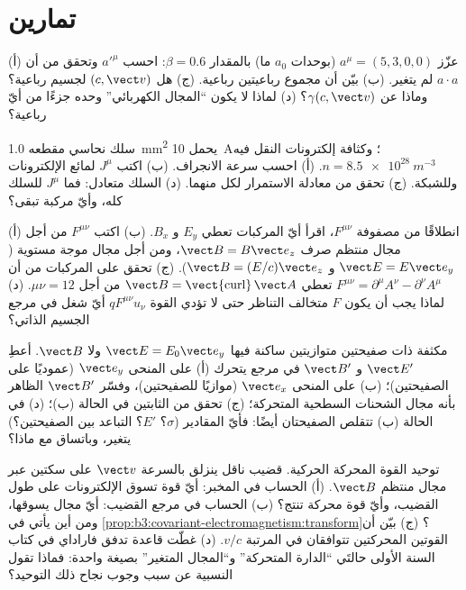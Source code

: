 \section{تمارين}

\begin{exercise}[$\star$]\label{exo:b3:covariant-electromagnetism:1}
(أ) عزّز $a^\mu = (5, 3, 0, 0)$ (بوحدات $a_0$ ما) بالمقدار $\beta =
0.6$: احسب $a'^\mu$ وتحقق من أن $a\cdot a$ لم يتغير. (ب) بيّن
أن مجموع رباعيتين رباعية. (ج) هل $(c,
\vect v)$ لجسيم رباعية؟ وماذا عن $\gamma(c, \vect v)$؟ (د)
لماذا لا يكون ``المجال الكهربائي'' وحده جزءًا من أيّ رباعية؟
\end{exercise}

\begin{exercise}[$\star$]\label{exo:b3:covariant-electromagnetism:2}
سلك نحاسي مقطعه \qty{1.0}{mm^2} يحمل \qty{10}{A}؛
وكثافة إلكترونات النقل فيه $n = \qty{8.5e28}{m^{-3}}$. (أ) احسب
سرعة الانجراف. (ب) اكتب $J^\mu$ لمائع الإلكترونات وللشبكة.
(ج) تحقق من معادلة الاستمرار لكل منهما. (د) السلك
متعادل: فما $J^\mu$ للسلك كله، وأيّ مركبة تبقى؟
\end{exercise}

\begin{exercise}[$\star$]\label{exo:b3:covariant-electromagnetism:3}
(أ) انطلاقًا من مصفوفة $F^{\mu\nu}$، اقرأ أيّ المركبات تعطي
$E_y$ و $B_x$. (ب) اكتب $F^{\mu\nu}$ من أجل مجال منتظم صرف
$\vect B = B\vect e_z$، ومن أجل مجال موجة مستوية
($\vect E = E\vect e_y$ و $\vect B = (E/c)\vect e_z$). (ج) تحقق على
المركبات من أن $F^{\mu\nu} = \partial^\mu A^\nu - \partial^\nu
A^\mu$ تعطي $\vect B = \operatorname{\vect{curl}}\vect A$ من أجل
$\mu\nu = 12$. (د) لماذا يجب أن يكون $F$ متخالف التناظر حتى لا تؤدي القوة
$qF^{\mu\nu}u_\nu$ أيّ شغل في مرجع الجسيم الذاتي؟
\end{exercise}

\begin{exercise}[$\star$]\label{exo:b3:covariant-electromagnetism:4}
مكثفة ذات صفيحتين متوازيتين ساكنة فيها $\vect E = E_0\vect e_y$
ولا $\vect B$. أعطِ $\vect E'$ و $\vect B'$ في مرجع يتحرك (أ)
على المنحى $\vect e_y$ (عموديًا على الصفيحتين)؛ (ب) على المنحى $\vect
e_x$ (موازيًا للصفيحتين)، وفسّر $\vect B'$ الظاهر
بأنه مجال الشحنات السطحية المتحركة؛ (ج) تحقق من الثابتين
في الحالة (ب)؛ (د) في الحالة (ب) تتقلص الصفيحتان أيضًا: فأيّ
المقادير ($\sigma$؟ $E'$؟ التباعد بين الصفيحتين؟) يتغير، وباتساق مع ماذا؟
\end{exercise}

\begin{exercise}[$\star\star$]\label{exo:b3:covariant-electromagnetism:5}
توحيد القوة المحركة الحركية. قضيب ناقل ينزلق بالسرعة $\vect v$ على سكتين
عبر مجال منتظم $\vect B$. (أ) الحساب في المخبر: أيّ قوة تسوق
الإلكترونات على طول القضيب، وأيّ قوة محركة تنتج؟ (ب) الحساب في مرجع القضيب:
أيّ مجال يسوقها، ومن أين يأتي في
\cref{prop:b3:covariant-electromagnetism:transform}؟ (ج) بيّن أن
القوتين المحركتين تتوافقان في المرتبة $v/c$. (د) غطّت قاعدة تدفق فاراداي في كتاب السنة
الأولى حالتَي ``الدارة المتحركة'' و``المجال المتغير''
بصيغة واحدة: فماذا تقول النسبية عن سبب وجوب نجاح ذلك
التوحيد؟
\end{exercise}

